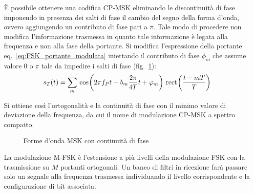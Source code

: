 \`{E} possibile ottenere una codifica CP-\ac{MSK} eliminando le discontinuità di fase imponendo in presenza dei salti di fase il cambio del segno della forma d'onda, ovvero aggiungendo un contributo di fase pari a $\pi$. Tale modo di procedere non modifica l'informazione trasmessa in quanto tale informazione è legata alla frequenza e non alla fase della portante. Si modifica l'espressione della portante eq.~\ref{eq:FSK_portante_modulata} iniettando il contributo di fase $\phi_m$ che assume valore $0$ o $\pi$ tale da impedire i salti di fase (fig.~\ref{fig:FSK_forme_d'onda_fase_continua}):
\begin{equation}
s_T(t)=\sum_{m}{\,{\operatorname{cos}}^{}\!\left({2\pi f_P t + b_m\frac{2\pi}{4T}t + \varphi_m}\right)\,{\operatorname{rect}}^{}\!\left({\frac{t-m T}{T}}\right)}
\label{eq:FSK_portante_modulata_fase_continua}
\end{equation}

Si ottiene così l'ortogonalità e la continuità di fase con il minimo valore di deviazione della frequenza, da cui il nome di modulazione CP-\ac{MSK} a spettro compatto.

\begin{figure}[ht]\centering
	\def\freqP{1}
	\caption{Forme d'onda \ac{MSK} con continuità di fase}
	\label{fig:FSK_forme_d'onda_fase_continua}
\end{figure}

La modulazione \ac{M-FSK} è l'estensione a più livelli della modulazione \ac{FSK} con la trasmissione su $M$ portanti ortogonali. Un banco di filtri in ricezione farà passare solo un segnale alla frequenza trasmessa individuando il livello corrispondente e la configurazione di bit associata.


